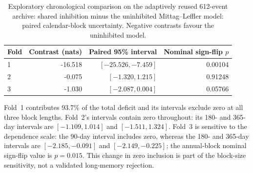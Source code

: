 \begin{table}[htbp]
\centering
\begin{tabular}{lrrr}
\toprule
Fold & Contrast (nats) & Paired 95\% interval & Nominal sign-flip $p$ \\
\midrule
1 & -16.518 & $[-25.526,-7.459]$ & 0.00104 \\
2 & -0.075 & $[-1.320,1.215]$ & 0.91248 \\
3 & -1.030 & $[-2.087,0.004]$ & 0.05766 \\
\bottomrule
\end{tabular}
\caption{Exploratory chronological comparison on the adaptively reused 612-event archive: shared inhibition minus the uninhibited Mittag--Leffler model: paired calendar-block uncertainty. Negative contrasts favour the uninhibited model.}
\label{tab:nz_score_uncertainty}
\end{table}

Fold~1 contributes 93.7\% of the total deficit and its intervals exclude zero at all three block lengths. Fold~2's intervals contain zero throughout: its 180- and 365-day intervals are $[-1.109,1.014]$ and $[-1.511,1.324]$. Fold~3 is sensitive to the dependence scale: the 90-day interval includes zero, whereas the 180- and 365-day intervals are $[-2.185,-0.091]$ and $[-2.149,-0.225]$; the annual-block nominal sign-flip value is $p=0.015$. This change in zero inclusion is part of the block-size sensitivity, not a validated long-memory rejection.
